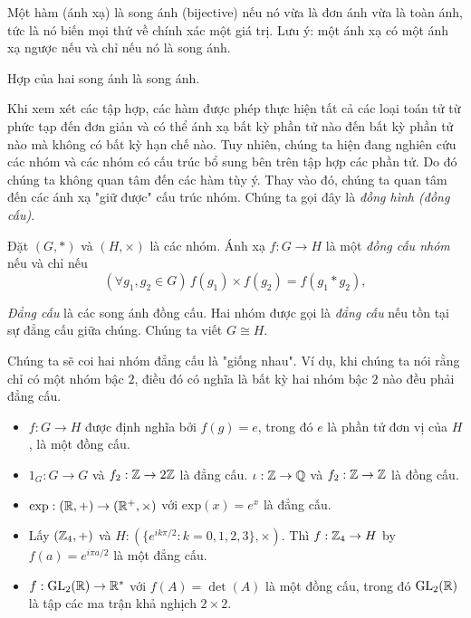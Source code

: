 \begin{defi}
  Một hàm (ánh xạ) là song ánh (bijective) nếu nó vừa là đơn ánh vừa là toàn ánh, tức là nó biến mọi thứ về chính xác một giá trị. Lưu ý: một ánh xạ có một ánh xạ ngược nếu và chỉ nếu nó là song ánh.
\end{defi}



\begin{lemma}
  Hợp của hai song ánh là song ánh.
\end{lemma}

Khi xem xét các tập hợp, các hàm được phép thực hiện tất cả các loại toán tử từ phức tạp đến đơn giản và có thể ánh xạ bất kỳ phần tử nào đến bất kỳ phần tử nào mà không có bất kỳ hạn chế nào. Tuy nhiên, chúng ta hiện đang nghiên cứu các nhóm và các nhóm có cấu trúc bổ sung bên trên tập hợp các phần tử. Do đó chúng ta không quan tâm đến các hàm tùy ý. Thay vào đó, chúng ta quan tâm đến các ánh xạ "giữ được" cấu trúc nhóm. Chúng ta gọi đây là \emph{đồng hình (đồng cấu)}.
\begin{defi}
  Đặt $(G, *)$ và $(H, \times)$ là các nhóm. Ánh xạ $f:G\rightarrow H$ là một \emph{đồng cấu nhóm} nếu và chỉ nếu
  \[
   ( \forall g_1, g_2 \in G)\, f(g_1)\times f(g_2) = f(g_1 * g_2),
  \]
\end{defi}

\begin{defi}
  \emph{Đẳng cấu} là các song ánh đồng cấu. Hai nhóm được gọi là \emph{đẳng cấu} nếu tồn tại sự đẳng cấu giữa chúng. Chúng ta viết $G\cong H$.
\end{defi}
Chúng ta sẽ coi hai nhóm đẳng cấu là "giống nhau". Ví dụ, khi chúng ta nói rằng chỉ có một nhóm bậc $2$, điều đó có nghĩa là bất kỳ hai nhóm bậc $2$ nào đều phải đẳng cấu.

\begin{eg}\leavevmode
  \begin{itemize}
    \item $f: G \to H$ được định nghĩa bởi $f(g) = e$, trong đó $e$ là phần tử đơn vị của $H$, là một đồng cấu.
    \item $1_G: G \rightarrow G$ và $f_2: \mathbb{Z} \rightarrow 2\mathbb{Z}$ là đẳng cấu. $\iota: \mathbb{Z}\rightarrow\mathbb{Q}$ và $f_2:\mathbb{Z}\rightarrow\mathbb{Z}$ là đồng cấu.
    \item $\mathrm{exp}: (\mathbb{R}, +) \rightarrow (\mathbb{R}^+, \times)$ với $\mathrm{exp}(x) = e^x$ là đẳng cấu.
    \item Lấy $(\mathbb{Z}_4, +)$ và $H: (\{e^{ik\pi/2}:k=0, 1 ,2, 3\}, \times)$. Thì $f: \mathbb{Z}_4 \rightarrow H$ by $f(a) = e^{i\pi a/2}$ là một đẳng cấu.
    \item $f: \mathrm{GL}_2(\mathbb{R}) \rightarrow \mathbb{R}^*$ với $f(A) = \det(A)$ là một đồng cấu, trong đó $\mathrm{GL}_2(\mathbb{R})$ là tập các ma trận khả nghịch $2\times 2$.
  \end{itemize}
\end{eg}

